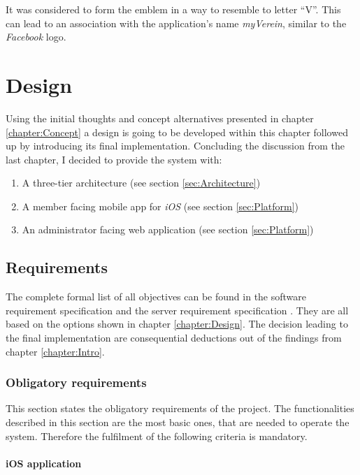 It was considered to form the emblem in a way to resemble to letter \enquote{V}. This can lead to an association with the application's name \emph{myVerein}, similar to the \emph{Facebook} logo. 

\chapter{Design}
\label{chapter:Design}

Using the initial thoughts and concept alternatives presented in chapter \vref{chapter:Concept} a design is going to be developed within this chapter followed up by introducing its final implementation. Concluding the discussion from the last chapter, I decided to provide the system with:

\begin{enumerate}
	\item A three-tier architecture (see section \vref{sec:Architecture})
	\item A member facing mobile app for \emph{iOS} (see section \vref{sec:Platform})
	\item An administrator facing web application (see section \vref{sec:Platform})
\end{enumerate}

\section{Requirements}
\label{sec:Requirements}
The complete formal list of all objectives can be found in the software requirement specification \cite{Steiler:2014aa} and the server requirement specification \cite{Steiler:2014ab}. They are all based on the options shown in chapter \vref{chapter:Design}. The decision leading to the final implementation are consequential deductions out of the findings from chapter \vref{chapter:Intro}.

\subsection{Obligatory requirements}
\label{sec:ObligatoryReq}

This section states the obligatory requirements of the project. The functionalities described in this section are the most basic ones, that are needed to operate the system. Therefore the fulfilment of the following criteria is mandatory.

\subsubsection{iOS application}

